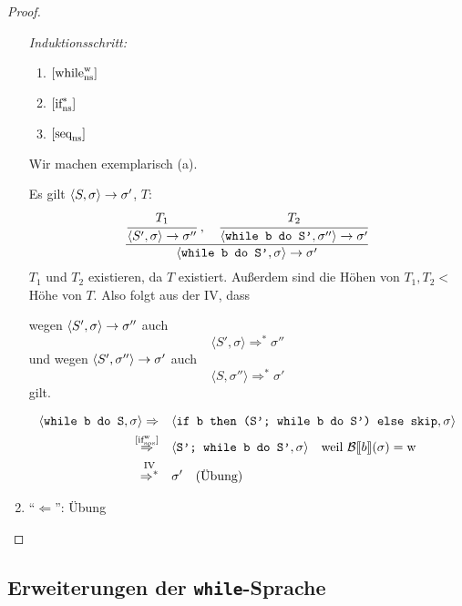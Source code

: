 \begin{proof}
\begin{enumerate}
            \par\bigskip
            \emph{Induktionsschritt:}
            \begin{enumerate}
                \item $\infruleNs[\true]{while}$
                \item $\infruleNs[*]{if}$
                \item $\infruleNs{seq}$
            \end{enumerate}

            Wir machen exemplarisch (a).

            Es gilt $\strans{S}{\sigma}{\sigma'}$, \dh{} $T$: \[
                \frac{
                    \cfrac{T_1}{\strans{S'}{\sigma}{\sigma''}}
                    \;,\quad
                    \cfrac{T_2}{\strans{\texttt{while b do S'}}{\sigma''}{\sigma'}}
                }{
                    \strans{\texttt{while b do S'}}{\sigma}{\sigma'}
                }
            \]
            $T_1$ und $T_2$ existieren, da $T$ existiert. Außerdem sind die Höhen von $T_1, T_2 < $ Höhe von $T$. Also folgt aus der IV, dass

            wegen $\strans{S'}{\sigma}{\sigma''}$ auch \[
                \langle S', \sigma \rangle \Rightarrow^* \sigma''
            \]
            und wegen $\strans{S'}{\sigma''}{\sigma'}$ auch \[
                \langle S, \sigma'' \rangle \Rightarrow^* \sigma'
            \]
            gilt.

            \begin{align*}
                \langle \texttt{while b do S}, \sigma \rangle \Rightarrow & \quad \langle \texttt{if b then (S'; while b do S') else skip}, \sigma \rangle \\
                \overset{\infruleSos[\true]{if}}{\Rightarrow} & \quad \langle \texttt{S'; while b do S'}, \sigma \rangle \quad \text{weil } \Bsem{b}(\sigma) = \true \\
                \overset{\text{IV}}{\Rightarrow^*} & \quad \sigma' \quad \text{(Übung)}
            \end{align*}

        \item ``$\Leftarrow$'': Übung
    \end{enumerate}
\end{proof}



\subsection{Erweiterungen der \texttt{while}-Sprache}


